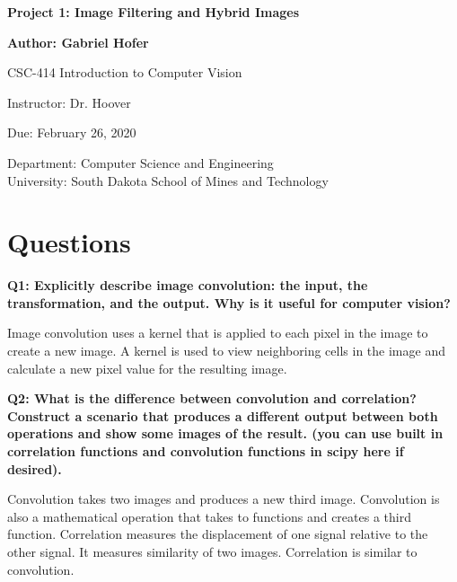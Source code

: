 \documentclass[12pt]{article}
\begin{document}
\begin{titlepage}
   \begin{center}
       \vspace*{1cm}
       \large
       \textbf{Project 1: Image Filtering and Hybrid Images}
       \normalsize

       \vspace{0.5cm}

       \textbf{Author: Gabriel Hofer}

       \vspace{0.5cm}

       CSC-414 Introduction to Computer Vision

       \vspace{0.5cm}

       Instructor: Dr. Hoover

       \vspace{0.5cm}

       Due: February 26, 2020

       \vfill

       Department: Computer Science and Engineering\\
       University: South Dakota School of Mines and Technology\\
   \end{center}
\end{titlepage}
\newpage
\section{Questions}
\textbf{Q1: Explicitly describe image convolution: the input, the transformation, and the output.
Why is it useful for computer vision?} 

Image convolution uses a kernel that is applied to each pixel in the image to create a new image.
A kernel is used to view neighboring cells in the image and calculate a new pixel value for the 
resulting image.

\textbf{Q2: What is the difference between convolution and correlation? Construct a scenario that
produces a different output between both operations and show some images of the result.
(you can use built in correlation functions and convolution functions in scipy here if
desired).}  

Convolution takes two images and produces a new third image. Convolution is also a mathematical
operation that takes to functions and creates a third function.
Correlation measures the displacement of one signal relative to the other signal. It measures 
similarity of two images.
Correlation is similar to convolution.  
\end{document}
